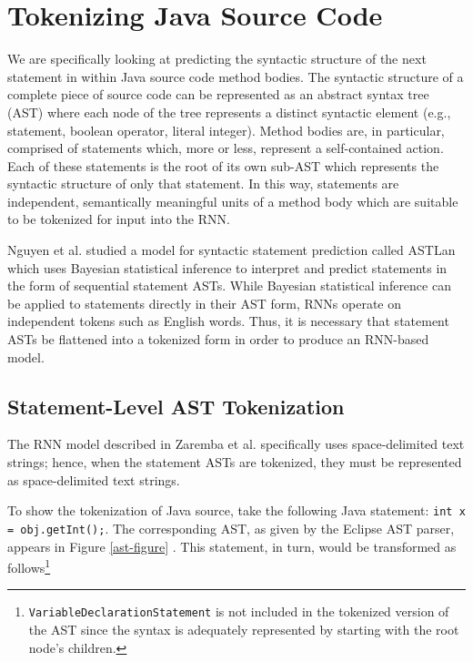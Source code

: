 \documentclass[runningheads,a4paper]{llncs}
\begin{document}


\section{Tokenizing Java Source Code}

We are specifically looking at predicting the syntactic structure  of the next 
statement in within Java source code method bodies. The syntactic structure 
of a complete piece of source code can be represented as an abstract 
syntax tree (AST) where each node of the tree represents a distinct 
syntactic element (e.g., statement, boolean operator, literal integer). 
Method bodies are, in particular, comprised of statements which, more or 
less, represent a self-contained action. Each of these statements is the 
root of its own sub-AST which represents the syntactic structure of only 
that statement. In this way, statements are 
independent, semantically meaningful units of a method body which are suitable 
to be tokenized for input into the RNN.

Nguyen et al. \cite{Nguyen} studied a model for syntactic statement prediction 
called ASTLan which uses Bayesian statistical inference to interpret and 
predict statements in the form of sequential statement ASTs. While Bayesian 
statistical inference can be applied to statements directly in their AST 
form, RNNs operate on independent tokens such as English words. Thus, it is 
necessary that statement ASTs be flattened into a tokenized form in order to 
produce an RNN-based model.

\subsection{Statement-Level AST Tokenization}

The RNN model described in Zaremba et al. \cite{Zaremba} specifically uses space-delimited 
text strings; hence, when the statement ASTs are tokenized, they 
must be represented as space-delimited text strings.

To show the tokenization of Java source, take the following Java statement:
\texttt{int x = obj.getInt();}.
The corresponding AST, as given by the Eclipse AST parser, appears in Figure \ref{ast-figure} \cite{Eclipse}.
This statement, in turn, would be transformed as follows\footnote{
\texttt{VariableDeclarationStatement} is not included in the
tokenized version of the AST since the syntax is adequately represented
by starting with the root node's children.}
\end{document}
